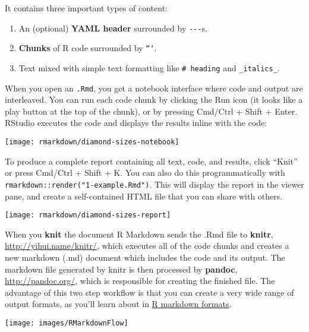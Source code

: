 \documentclass[]{book}
\providecommand{\tightlist}{%
  \setlength{\itemsep}{0pt}\setlength{\parskip}{0pt}}
\begin{document}
It contains three important types of content:

\begin{enumerate}
\def\labelenumi{\arabic{enumi}.}
\tightlist
\item
  An (optional) \textbf{YAML header} surrounded by \texttt{-\/-\/-}s.
\item
  \textbf{Chunks} of R code surrounded by \texttt{```}.
\item
  Text mixed with simple text formatting like \texttt{\#\ heading} and
  \texttt{\_italics\_}.
\end{enumerate}

When you open an \texttt{.Rmd}, you get a notebook interface where code
and output are interleaved. You can run each code chunk by clicking the
Run icon (it looks like a play button at the top of the chunk), or by
pressing Cmd/Ctrl + Shift + Enter. RStudio executes the code and
displays the results inline with the code:

\begin{center}\texttt{[image: rmarkdown/diamond-sizes-notebook]} \end{center}

To produce a complete report containing all text, code, and results,
click ``Knit'' or press Cmd/Ctrl + Shift + K. You can also do this
programmatically with \texttt{rmarkdown::render("1-example.Rmd")}. This
will display the report in the viewer pane, and create a self-contained
HTML file that you can share with others.

\begin{center}\texttt{[image: rmarkdown/diamond-sizes-report]} \end{center}

When you \textbf{knit} the document R Markdown sends the .Rmd file to
\textbf{knitr}, \url{http://yihui.name/knitr/}, which executes all of
the code chunks and creates a new markdown (.md) document which includes
the code and its output. The markdown file generated by knitr is then
processed by \textbf{pandoc}, \url{http://pandoc.org/}, which is
responsible for creating the finished file. The advantage of this two
step workflow is that you can create a very wide range of output
formats, as you'll learn about in
\protect\hyperlink{r-markdown-formats}{R markdown formats}.

\begin{center}\texttt{[image: images/RMarkdownFlow]} \end{center}
\end{document}
